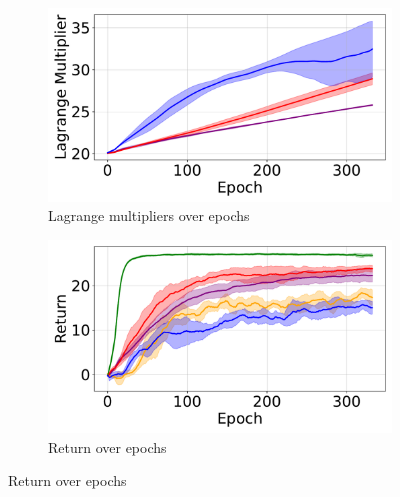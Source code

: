 \begin{figure}[H]
\begin{minipage}{0.48\textwidth}
        \begin{subfigure}{\linewidth}
            \centering
            \includegraphics[width=\linewidth]{figure/PointGoal/limit 0.5/lagrange.pdf}
            \caption{Lagrange multipliers over epochs}
        \end{subfigure}

        \caption*{Cost return limit: 0.5}
    \end{minipage}
    \hfill
    \begin{minipage}{0.48\textwidth}
        \centering
        \begin{subfigure}{\linewidth}
            \centering
            \includegraphics[width=\linewidth]{figure/PointGoal/limit 1/EpRet.pdf}
            \caption{Return over epochs}
        \end{subfigure}


\end{minipage}
\end{figure}
